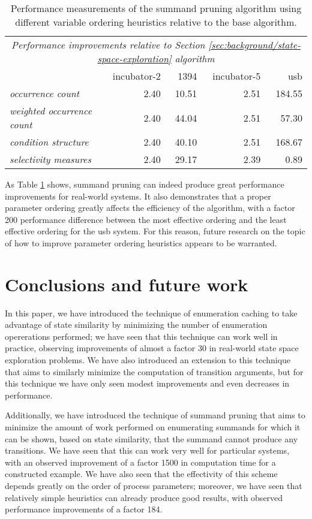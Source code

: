 \documentclass[a4paper]{article}
\begin{document}
\begin{table}[ht]
\begin{center}
\begin{tabular}{l|rrrr}
\multicolumn{5}{c}{\emph{Performance improvements relative to Section \ref{sec:background/state-space-exploration} algorithm}} \\
& incubator-2 & 1394 & incubator-5 & usb \\
\hline
\emph{occurrence count} & 2.40 & 10.51 & 2.51 & 184.55 \\
\emph{weighted occurrence count} & 2.40 & 44.04 & 2.51 & 57.30 \\
\emph{condition structure} & 2.40 & 40.10 & 2.51 & 168.67 \\
\emph{selectivity measures} & 2.40 & 29.17 & 2.39 & 0.89 \\
\end{tabular}
\caption{Performance measurements of the summand pruning algorithm using different variable ordering heuristics relative to the base algorithm.}
\label{tbl:summand-pruning-performance}
\end{center}
\end{table}

As Table \ref{tbl:summand-pruning-performance} shows, summand pruning can indeed produce great performance improvements for real-world systems. It also demonstrates that a proper parameter ordering greatly affects the efficiency of the algorithm, with a factor 200 performance difference between the most effective ordering and the least effective ordering for the usb system. For this reason, future research on the topic of how to improve parameter ordering heuristics appears to be warranted.


\section{Conclusions and future work}
In this paper, we have introduced the technique of enumeration caching to take advantage of state similarity by minimizing the number of enumeration opererations performed; we have seen that this technique can work well in practice, observing improvements of almost a factor 30 in real-world state space exploration problems. We have also introduced an extension to this technique that aims to similarly minimize the computation of transition arguments, but for this technique we have only seen modest improvements and even decreases in performance.

Additionally, we have introduced the technique of summand pruning that aims to minimize the amount of work performed on enumerating summands for which it can be shown, based on state similarity, that the summand cannot produce any transitions. We have seen that this can work very well for particular systems, with an observed improvement of a factor 1500 in computation time for a constructed example. We have also seen that the effectivity of this scheme depends greatly on the order of process parameters; moreover, we have seen that relatively simple heuristics can already produce good results, with observed performance improvements of a factor 184.
\end{document}
